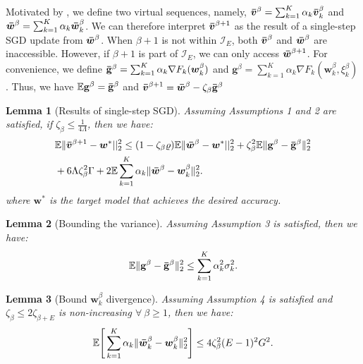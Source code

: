 \documentclass[letter,journal]{IEEEtran}
\newtheorem{lemma}{Lemma}
\begin{document}
\begin{appendices}
Motivated by \cite{ribero2022federated}, we define two virtual sequences, namely, $\boldsymbol{\Bar {v}}^{\beta}=\sum_{k=1}^{K}\alpha_{k}\boldsymbol{\Bar v}_{k}^{\beta}$ and $\boldsymbol{\Bar w}^{\beta}=\sum_{k=1}^{K}\alpha_{k}\boldsymbol{\Bar w}_{k}^{\beta}$. We can therefore interpret $\boldsymbol{\Bar {v}}^{\beta+1}$ as the result of a single-step SGD update from $\boldsymbol{\Bar w}^{\beta}$. When $\beta+1$ is not within $\mathcal{I}_E$, both $\boldsymbol{\Bar {v}}^{\beta}$ and $\boldsymbol{\Bar {w}}^{\beta}$ are inaccessible. However, if $\beta+1$ is part of $\mathcal{I}_E$, we can only access $\boldsymbol{\Bar w}^{\beta+1}$. For convenience, we define $\mathbf{\Bar g}^{\beta}=\sum_{k=1}^{K}\alpha_{k}\nabla F_{k}(\boldsymbol{w}_{k}^{\beta})$ and $\mathbf{g}^{\beta}=\sum_{k=1}^{K}\alpha_{k}\nabla F_{k}(\boldsymbol{w}_{k}^{\beta},\xi_{k}^{\beta})$. Thus, we have $\mathbb{E}\mathbf{g}^{\beta}=\mathbf{\Bar g}^{\beta}$ and $\boldsymbol{\Bar {v}}^{\beta+1}=\boldsymbol{\Bar {w}}^{\beta}-\zeta_{{\beta}} \mathbf{\Bar g}^{\beta}$
\begin{lemma}[Results of single-step SGD] 
Assuming Assumptions 1 and 2 are satisfied, if $\zeta_{{\beta}}\leq\frac{1}{4\Lambda}$, then we have:
\begin{align}
     &\mathbb{E}\|\boldsymbol{\Bar {v}}^{\beta+1}-\boldsymbol{w}^*||^2_2\leq (1-\zeta_{{\beta}}\varrho)\mathbb{E}\|\boldsymbol{\Bar {w}}^{\beta}-\boldsymbol{w}^*||^2_2+\zeta_{{\beta}}^2\mathbb{E}\|\mathbf{g}^{\beta}-\mathbf{\Bar g}^{\beta}\|^2_2\nonumber
     \\&+6\Lambda \zeta_{{\beta}}^2\Gamma+2\mathbb{E}\sum_{k=1}^{K}\alpha_{k}\|\boldsymbol{\Bar {w}}^{\beta}-\boldsymbol{{w}}^{\beta}_{k}\|^2_2.   \nonumber
\end{align}
where $\boldsymbol{w}^*$ is the target model that achieves the desired accuracy.   
\end{lemma}
\begin{lemma}[Bounding the variance]
Assuming Assumption 3 is satisfied, then we have:
$$\mathbb{E}\|\mathbf{g}^{\beta}-\mathbf{\Bar g}^{\beta}\|^2_2\leq \sum_{k=1}^{K}\alpha_{k}^2\sigma_{k}^{2}.$$
\end{lemma}
\begin{lemma}[Bound $\boldsymbol{{w}}^{\beta}_{k}$ divergence]
Assuming Assumption 4 is satisfied and $\zeta_{\beta}\leq2\zeta_{\beta+E}$ is non-increasing $\forall~\beta\geq 1$, then we have:
$$  \mathbb{E}\Bigg[\sum_{k=1}^{K}\alpha_{k}\|\boldsymbol{{\Bar w}}^{\beta}_{k}-\boldsymbol{{w}}^{\beta}_{k}\|^2_2\Bigg]\leq4\zeta_{{\beta}}^2(E-1)^2 G^2.$$

\end{lemma}
\end{appendices}
\end{document}

